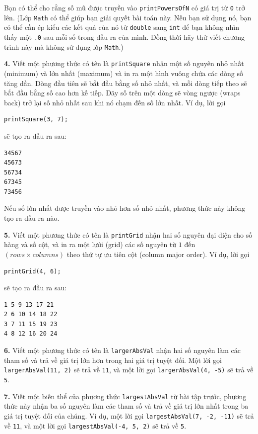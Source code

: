 Bạn có thể cho rằng số mũ được truyền vào \texttt{printPowersOfN} có giá
trị từ \texttt{0} trở lên. (Lớp \texttt{Math} có thể giúp bạn giải quyết
bài toán này. Nếu bạn sử dụng nó, bạn có thể cần ép kiểu các kết quả của
nó từ \texttt{double} sang \texttt{int} để bạn không nhìn thấy một
\texttt{.0} sau mỗi số trong đầu ra của mình. Đồng thời hãy thử viết
chương trình này mà không sử dụng lớp \texttt{Math}.)

\textbf{4.} Viết một phương thức có tên là \texttt{printSquare} nhận một
số nguyên nhỏ nhất (minimum) và lớn nhất (maximum) và in ra một hình
vuông chứa các dòng số tăng dần. Dòng đầu tiên sẽ bắt đầu bằng số nhỏ
nhất, và mỗi dòng tiếp theo sẽ bắt đầu bằng số cao hơn kế tiếp. Dãy số
trên một dòng sẽ vòng ngược (wraps back) trở lại số nhỏ nhất sau khi nó
chạm đến số lớn nhất. Ví dụ, lời gọi

\begin{verbatim}
printSquare(3, 7);
\end{verbatim}

sẽ tạo ra đầu ra sau:

\begin{verbatim}
34567
45673
56734
67345
73456
\end{verbatim}

Nếu số lớn nhất được truyền vào nhỏ hơn số nhỏ nhất, phương thức này
không tạo ra đầu ra nào.

\textbf{5.} Viết một phương thức có tên là \texttt{printGrid} nhận hai
số nguyên đại diện cho số hàng và số cột, và in ra một lưới (grid) các
số nguyên từ \(1\) đến \((rows \times columns)\) theo thứ tự ưu tiên cột
(column major order). Ví dụ, lời gọi

\begin{verbatim}
printGrid(4, 6);
\end{verbatim}

sẽ tạo ra đầu ra sau:

\begin{verbatim}
1 5 9 13 17 21
2 6 10 14 18 22
3 7 11 15 19 23
4 8 12 16 20 24
\end{verbatim}

\textbf{6.} Viết một phương thức có tên là \texttt{largerAbsVal} nhận
hai số nguyên làm các tham số và trả về giá trị lớn hơn trong hai giá
trị tuyệt đối. Một lời gọi \texttt{largerAbsVal(11,\ 2)} sẽ trả về
\texttt{11}, và một lời gọi \texttt{largerAbsVal(4,\ -5)} sẽ trả về
\texttt{5}.

\textbf{7.} Viết một biến thể của phương thức \texttt{largestAbsVal} từ
bài tập trước, phương thức này nhận ba số nguyên làm các tham số và trả
về giá trị lớn nhất trong ba giá trị tuyệt đối của chúng. Ví dụ, một lời
gọi \texttt{largestAbsVal(7,\ -2,\ -11)} sẽ trả về \texttt{11}, và một
lời gọi \texttt{largestAbsVal(-4,\ 5,\ 2)} sẽ trả về \texttt{5}.

